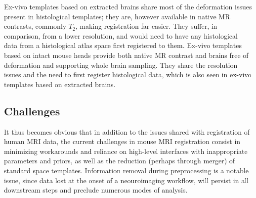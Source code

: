 Ex-vivo templates based on extracted brains share most of the deformation issues present in histological templates;
they are, however available in native MR contrasts, commonly $T_2$, making registration far easier.
They suffer, in comparison, from a lower resolution, and would need to have any histological data from a histological atlas space first registered to them.
Ex-vivo templates based on intact mouse heads provide both native MR contrast and brains free of deformation and supporting whole brain sampling.
They share the resolution issues and the need to first register histological data, which is also seen in ex-vivo templates based on extracted brains.

\subsection{Challenges}
It thus becomes obvious that in addition to the issues shared with registration of human MRI data, the current challenges in mouse MRI registration consist in minimizing workarounds and reliance on high-level interfaces with inappropriate parameters and priors, as well as the reduction (perhaps through merger) of standard space templates.
Information removal during preprocessing is a notable issue, since data lost at the onset of a neouroimaging workflow, will persist in all downstream steps and preclude numerous modes of analysis.

